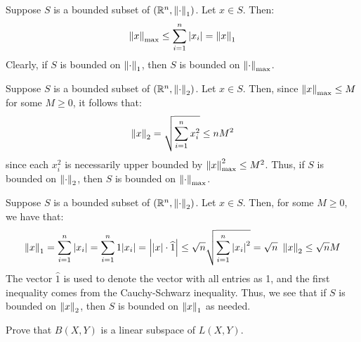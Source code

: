 \begin{soln}[title=1 implies Max]
    Suppose $ S $ is a bounded subset of $ (\mathbb{R}^{n}, \left\|\cdot\right\|_{1}) $.
    Let $ x \in S $. Then:
    \begin{equation*}
        \left\|x\right\|_{\textrm{max}} \leq \sum_{i=1}^{n} {\abs{x_{i}}} = \left\|x\right\|_{1}
    \end{equation*}
    Clearly, if $ S $ is bounded on $ \left\|\cdot\right\|_{1} $, then
    $ S $ is bounded on $ \left\|\cdot\right\|_{\textrm{max}} $.
\end{soln}

\begin{soln}[title=Max implies 2]
    Suppose $ S $ is a bounded subset of $ (\mathbb{R}^{n}, \left\|\cdot\right\|_{2}) $.
    Let $ x \in S $. Then, since $ \left\|x\right\|_{\textrm{max}} \leq M $ for some
    $ M \geq 0 $, it follows that:
    \begin{equation*}
        \left\|x\right\|_{2} = \sqrt{\sum_{i=1}^{n} {x_{i}^{2}} } \leq nM^{2}
    \end{equation*} since each $ x_{i}^{2} $ is necessarily upper bounded by
    $ \left\|x\right\|_{\textrm{max}}^{2} \leq M^{2} $.
    Thus, if $ S $ is bounded on $ \left\|\cdot\right\|_{2} $, then
    $ S $ is bounded on $ \left\|\cdot\right\|_{\textrm{max}} $.
\end{soln}

\begin{soln}[title=2 implies 1]
    Suppose $ S $ is a bounded subset of $ (\mathbb{R}^{n}, \left\|\cdot\right\|_{2}) $.
    Let $ x \in S $. Then, for some $ M \geq 0 $, we have that:
    \begin{equation*}
        \left\|x\right\|_{1} = \sum_{i=1}^{n} {\abs{x_{i}}} = \sum_{i=1}^{n}
        {1\abs{x_{i}}} = \abs{\abs{x} \cdot \widehat{1}} \leq \sqrt{n}
        \sqrt{\sum_{i=1}^{n} {\abs{x_{i}}^{2}} } 
        = \sqrt{n} \ \left\|x\right\|_{2} \leq \sqrt{n} M
    \end{equation*}
    The vector $ \hat{1} $ is used to denote the vector with all entries as 1,
    and the first inequality comes from the Cauchy-Schwarz inequality. \vsp
    Thus, we see that if $ S $ is bounded on $ \left\|x\right\|_{2} $, then $ S $
    is bounded on $ \left\|x\right\|_{1} $ as needed.
\end{soln}


\newpage
\label{q6}
\begin{qu}[num=6.1]
    Prove that $ B(X, Y) $ is a linear subspace of $ L(X, Y) $.
\end{qu}

